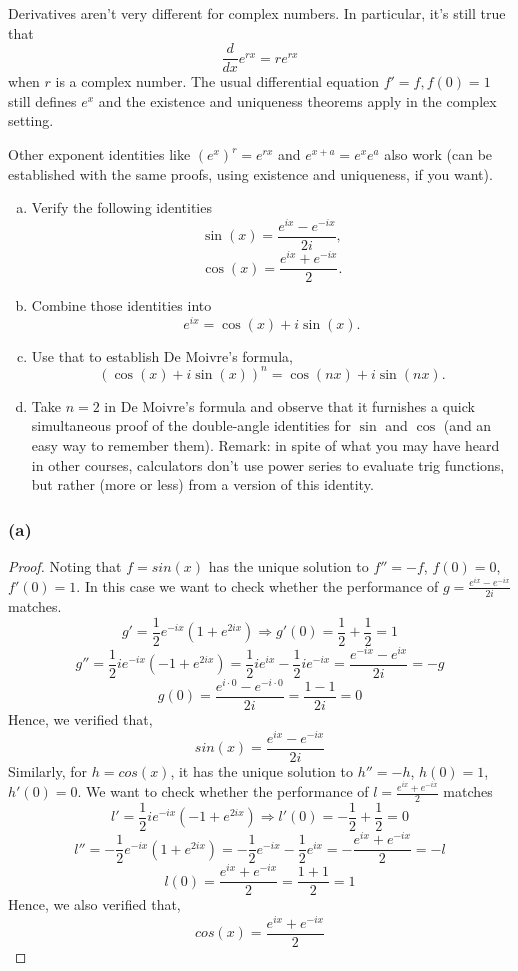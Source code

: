 \documentclass{article}
\begin{document}
\begin{problem}
    Derivatives aren't very different for complex numbers. In particular, it's still true that
    \[\frac{d}{dx} e^{rx} = re^{rx}\]
    when \(r\) is a complex number. The usual differential equation \(f'=f, f(0)=1\) still defines \(e^x\) and the existence and uniqueness theorems apply in the complex setting. 
    
    \hspace{2em}Other exponent identities like \((e^x)^r = e^{rx}\) and \(e^{x+a} = e^xe^a\) also work (can be established with the same proofs, using existence and uniqueness, if you want).
    \begin{enumerate}[a)]
        \item Verify the following identities
            \[\sin(x) = \frac{e^{ix} - e^{-ix}}{2i},\]
            \[\cos(x) = \frac{e^{ix} + e^{-ix}}{2}.\]
        \item Combine those identities into
            \[e^{ix} = \cos(x) + i\sin(x).\]
        \item Use that to establish De Moivre's formula,
            \[(\cos(x) + i\sin(x))^n = \cos(nx) + i\sin(nx).\]
        \item Take \(n=2\) in De Moivre's formula and observe that it furnishes a quick simultaneous proof of the double-angle identities for \(\sin\) and \(\cos\)  (and an easy way to remember them). Remark: in spite of what you may have heard in other courses, calculators don't use power series to evaluate trig functions, but rather (more or less) from a version of this identity.
    \end{enumerate}
\end{problem}

\subsubsection*{(a)}
\begin{proof}
    Noting that $f = sin(x)$ has the unique solution to $f'' = -f$, $f(0) = 0$, $f'(0) = 1$. In this case we want to check whether the 
    performance of $g = \frac{e^{ix} - e^{-ix}}{2i}$ matches.
    \[ g' = \frac{1}{2}e^{-ix}(1 + e^{2ix}) \Rightarrow g'(0) = \frac{1}{2} + \frac{1}{2} = 1 \]
    \[ g'' = \frac{1}{2} ie^{-ix}(-1 + e^{2ix}) = \frac{1}{2} ie^{ix} - \frac{1}{2} ie^{-ix} = \frac{e^{-ix} - e^{ix}}{2i} = -g \]
    \[ g(0) = \frac{e^{i \cdot 0} - e^{-i \cdot 0}}{2i} = \frac{1 - 1}{2i} = 0 \]
    Hence, we verified that, 
    \[ sin(x) = \frac{e^{ix} - e^{-ix}}{2i} \]
    Similarly, for $h = cos(x)$, it has the unique solution to $h'' = -h$, $h(0) = 1$, $h'(0) = 0$. 
    We want to check whether the performance of $l = \frac{e^{ix} + e^{-ix}}{2}$ matches
    \[ l' = \frac{1}{2}ie^{-ix}(-1 + e^{2ix}) \Rightarrow l'(0) = -\frac{1}{2} + \frac{1}{2} = 0 \]
    \[ l'' = -\frac{1}{2} e^{-ix}(1 + e^{2ix}) = -\frac{1}{2} e^{-ix} - \frac{1}{2} e^{ix} = -\frac{e^{ix} + e^{-ix}}{2} = -l \]
    \[ l(0) = \frac{e^{ix} + e^{-ix}}{2} = \frac{1 + 1}{2} = 1 \]
    Hence, we also verified that, 
    \[ cos(x) = \frac{e^{ix} + e^{-ix}}{2} \]
\end{proof}
\end{document}
